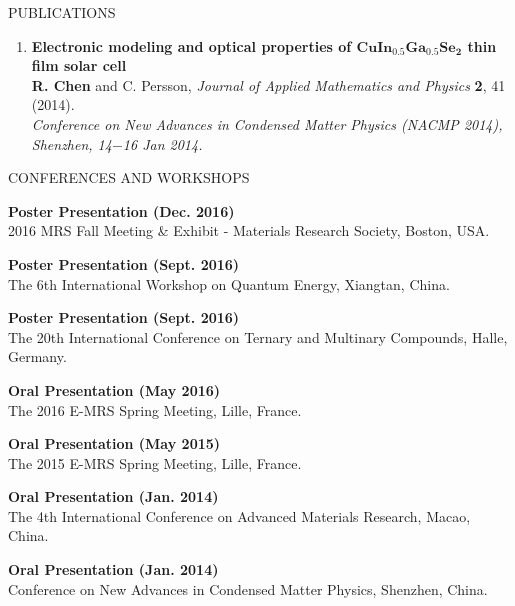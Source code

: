 \documentclass{resume} %
\begin{document}
\begin{rSection}{PUBLICATIONS}
\begin{enumerate}
\item{} \textbf{Electronic modeling and optical properties of $\mathbf {CuIn_{0.5}Ga_{0.5}Se_2}$ thin film solar cell}
\\ \textbf{R. Chen} and C. Persson,
\textit{Journal of Applied Mathematics and Physics} {\textbf 2}, 41 (2014). \\
\textit{Conference on New Advances in Condensed Matter Physics (NACMP 2014), Shenzhen, 14$-$16 Jan 2014.}

\end{enumerate}




\end{rSection}



\newpage

\begin{rSection}{CONFERENCES AND WORKSHOPS}

\textbf{Poster Presentation (Dec. 2016)} \\
2016 MRS Fall Meeting \& Exhibit - Materials Research Society, Boston, USA.

\textbf{Poster Presentation (Sept. 2016)} \\
The 6th International Workshop on Quantum Energy, Xiangtan, China.

\textbf{Poster Presentation (Sept. 2016)} \\
The 20th International Conference on Ternary and Multinary Compounds, Halle, Germany.

\textbf{Oral Presentation (May 2016)} \\
The 2016 E-MRS Spring Meeting, Lille, France.

\textbf{Oral Presentation (May 2015)} \\
The 2015 E-MRS Spring Meeting, Lille, France.

\textbf{Oral Presentation (Jan. 2014)} \\
The 4th International Conference on Advanced Materials Research, Macao, China.

\textbf{Oral Presentation (Jan. 2014)} \\
Conference on New Advances in Condensed Matter Physics, Shenzhen, China.




 
\end{rSection}
\end{document}
